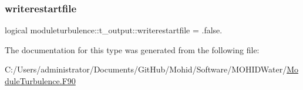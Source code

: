\mbox{\label{structmoduleturbulence_1_1t__output_a2592d970ed36fec5a7c576ead3ecbcdc}} 
\subsubsection{\texorpdfstring{writerestartfile}{writerestartfile}}
{\footnotesize\ttfamily logical moduleturbulence\+::t\+\_\+output\+::writerestartfile = .false.\hspace{0.3cm}{\ttfamily [private]}}



The documentation for this type was generated from the following file\+:\begin{DoxyCompactItemize}
\item 
C\+:/\+Users/administrator/\+Documents/\+Git\+Hub/\+Mohid/\+Software/\+M\+O\+H\+I\+D\+Water/\mbox{\hyperlink{_module_turbulence_8_f90}{Module\+Turbulence.\+F90}}\end{DoxyCompactItemize}
